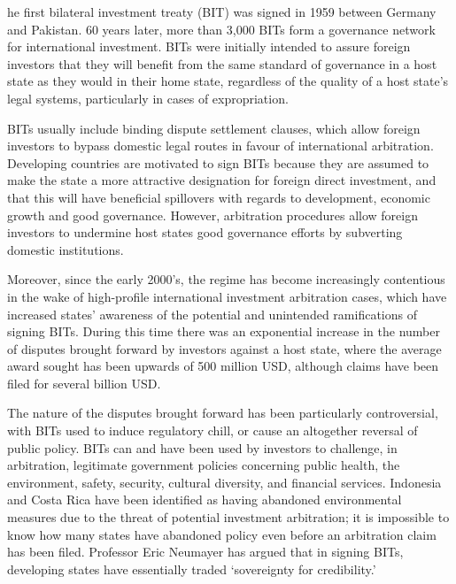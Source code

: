 \label{ch:bilateral-investment-treaties}

{\flushright{}}
\smallskip


he first bilateral investment treaty (BIT) was signed in 1959 between
   Germany and Pakistan. 60 years later, more than 3,000 BITs form a
   governance network for international investment. BITs were initially
   intended to assure foreign investors that they will benefit from the
   same standard of governance in a host state as they would in their home
   state, regardless of the quality of a host state's legal systems,
   particularly in cases of expropriation.

   BITs usually include binding dispute settlement clauses, which allow
   foreign investors to bypass domestic legal routes in favour of
   international arbitration. Developing countries are motivated to sign
   BITs because they are assumed to make the state a more attractive
   designation for foreign direct investment, and that this will have
   beneficial spillovers with regards to development, economic growth and
   good governance. However, arbitration procedures allow foreign
   investors to undermine host states good governance efforts by
   subverting domestic institutions.

   Moreover, since the early 2000's, the regime has become increasingly
   contentious in the wake of high-profile international investment
   arbitration cases, which have increased states' awareness of the
   potential and unintended ramifications of signing BITs. During this
   time there was an exponential increase in the number of disputes
   brought forward by investors against a host state, where the average
   award sought has been upwards of 500 million USD, although claims have
   been filed for several billion USD.

   The nature of the disputes brought forward has been particularly
   controversial, with BITs used to induce regulatory chill, or cause an
   altogether reversal of public policy. BITs can and have been used by
   investors to challenge, in arbitration, legitimate government policies
   concerning public health, the environment, safety, security, cultural
   diversity, and financial services. Indonesia and Costa Rica have been
   identified as having abandoned environmental measures due to the threat
   of potential investment arbitration; it is impossible to know how many
   states have abandoned policy even before an arbitration claim has been
   filed. Professor Eric Neumayer has argued that in signing BITs,
   developing states have essentially traded `sovereignty for
   credibility.'

